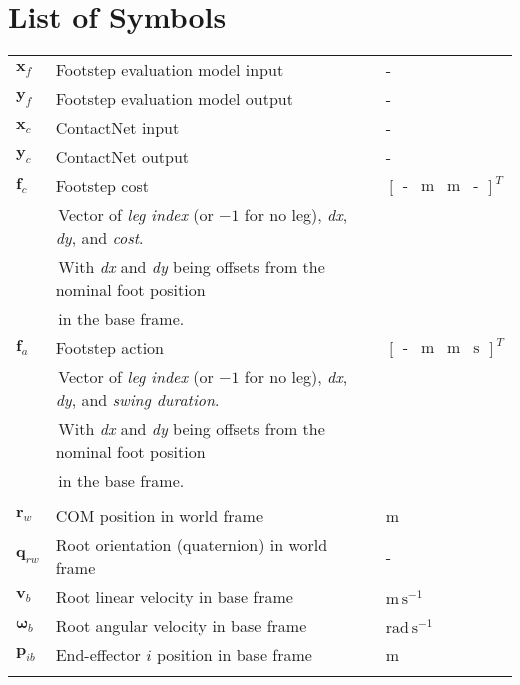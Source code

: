 \chapter*{List of Symbols}

\begin{table}[h!]
  \centering
  \begin{tabular}{lll}
    $\mathbf x_f$ & Footstep evaluation model input & - \\
    $\mathbf y_f$ & Footstep evaluation model output & - \\
    $\mathbf x_c$ & ContactNet input & - \\
    $\mathbf y_c$ & ContactNet output & - \\
    $\mathbf f_c$ & Footstep cost & $
    \begin{bmatrix}
      \text{-} & \text{m} & \text{m} & \text{-}
    \end{bmatrix}^T$ \\
    & \,\footnotesize{Vector of \textit{leg index} (or $-1$ for no
    leg), \textit{dx}, \textit{dy}, and \textit{cost}.} & \\
    & \,\footnotesize{With \textit{dx} and \textit{dy} being offsets
    from the nominal foot position} & \\
    & \,\footnotesize{in the base frame.} & \\
    $\mathbf f_a$ & Footstep action & $
    \begin{bmatrix}
      \text{-} & \text{m} & \text{m} & \text{s}
    \end{bmatrix}^T$ \\
    & \,\footnotesize{Vector of \textit{leg index} (or $-1$ for no
    leg), \textit{dx}, \textit{dy}, and \textit{swing duration}.} & \\
    & \,\footnotesize{With \textit{dx} and \textit{dy} being offsets
    from the nominal foot position} & \\
    & \,\footnotesize{in the base frame.} & \\
    & & \\

    $\mathbf r_w$ & COM position in world frame & m \\
    $\mathbf q_{rw}$ & Root orientation (quaternion) in world frame & - \\
    $\mathbf v_b$ & Root linear velocity in base frame &
    $\text{m}\,\text{s}^{-1}$ \\
    $\mathbf \omega_b$ & Root angular velocity in base frame &
    $\text{rad}\,\text{s}^{-1}$ \\
    $\mathbf p_{ib}$ & End-effector $i$ position in base frame & m \\
    & & \\


\end{tabular}
\end{table}
